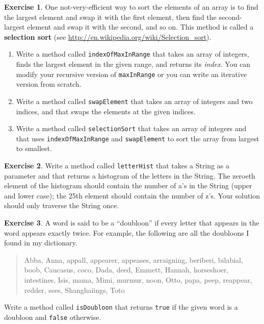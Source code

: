 \documentclass[12pt]{book}
\theoremstyle{definition}
\newtheorem{excz}{Exercise}[chapter]
\newenvironment{exercise}{\bigskip\begin{excz}\mbox{}}{\end{excz}}
\begin{document}
\begin{exercise}
One not-very-efficient way to sort the elements of an array
is to find the largest element and swap it with the first
element, then find the second-largest element and swap it with
the second, and so on.  This method is called a {\bf selection
sort} (see \url{http://en.wikipedia.org/wiki/Selection_sort}).

\begin{enumerate}

\item Write a method called {\tt indexOfMaxInRange} that 
takes an array of integers, finds the
largest element in the given range, and returns its {\em index}.
You can modify your recursive version of {\tt maxInRange} or
you can write an iterative version from scratch.

\item Write a method called {\tt swapElement} that takes an
array of integers and two indices, and that swaps the elements
at the given indices.

\item Write a method called {\tt selectionSort} that takes an array of
integers and that uses {\tt indexOfMaxInRange} and {\tt swapElement}
to sort the array from largest to smallest.

\end{enumerate}
\end{exercise}


\begin{exercise}
Write a method called {\tt letterHist} that takes a String as a
parameter and that returns a histogram of the letters in the String.
The zeroeth element of the histogram should contain the number of a's
in the String (upper and lower case); the 25th element should contain
the number of z's.
Your solution should only traverse the String once.
\end{exercise}


\begin{exercise}
A word is said to be a ``doubloon'' if every letter that appears in the
word appears exactly twice.  For example, the following are all the
doubloons I found in my dictionary.

\begin {quote}
Abba, Anna, appall, appearer, appeases, arraigning, beriberi,
bilabial, boob, Caucasus, coco, Dada, deed, Emmett, Hannah,
horseshoer, intestines, Isis, mama, Mimi, murmur, noon, Otto, papa,
peep, reappear, redder, sees, Shanghaiings, Toto
\end{quote}

Write a method called {\tt isDoubloon} that returns {\tt true}
if the given word is a doubloon and {\tt false} otherwise.
\end{exercise}
\end{document}
